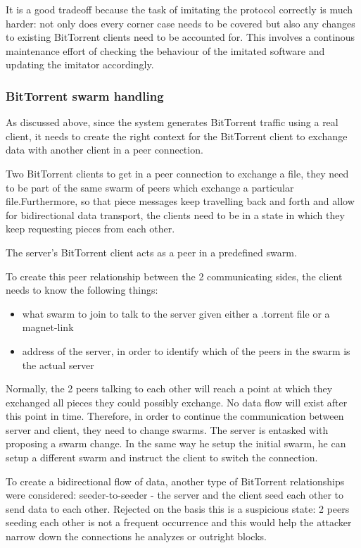 \documentclass[11pt]{article} %
\begin{document}
It is a good tradeoff because the task of imitating the protocol correctly is much harder: not only does every corner case needs to be covered but also any changes to existing BitTorrent clients need to be accounted for. This involves a continous maintenance effort of checking the behaviour of the imitated software and updating the imitator accordingly.

\subsubsection{BitTorrent swarm handling}
\label{subsubsec:swarmHandling}

As discussed above, since the system generates BitTorrent traffic using a real client, it needs to create the right context for the BitTorrent client to exchange data with another client in a peer connection.

Two BitTorrent clients to get in a peer connection to exchange a file, they need to be part of the same swarm of peers which exchange a particular file.Furthermore, so that piece messages keep travelling back and forth and allow for bidirectional data transport, the clients need to be in a state in which they keep requesting pieces from each other.

The server's BitTorrent client acts as a peer in a predefined swarm.

To create this peer relationship between the 2 communicating sides,  the client needs to know the following things:
\begin{itemize}
\item what swarm to join to talk to the server given either a .torrent file or a magnet-link
\item address of the server, in order to identify which of the peers in the swarm is the actual server
\end{itemize}

Normally, the 2 peers talking to each other will reach a point at which they exchanged all pieces they could possibly exchange. No data flow will exist after this point in time. Therefore, in order to continue the communication between server and client, they need to change swarms. The server is entasked with proposing a swarm change. In the same way he setup the initial swarm, he can setup a different swarm and instruct the client to switch the connection.

To create a bidirectional flow of data, another type of BitTorrent relationships were considered: seeder-to-seeder - the server and the client seed each other to send data to each other. Rejected on the basis this is a suspicious state: 2 peers seeding each other is not a frequent occurrence and this would help the attacker narrow down the connections he analyzes or outright blocks.
\end{document}
